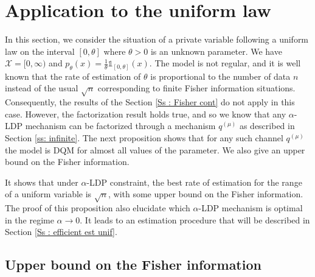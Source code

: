 \documentclass[a4paper, 11pt]{article}
\theoremstyle{definition}
\newcommand{\cX}{{\mathcal{X}}}
\newcommand{\indi}[1]{\mathds{1}_{#1}}
\begin{document}
{%








\section{Application to the uniform law}{\label{s: unif}}

In this section, we consider the situation of a private variable following a uniform law on the interval $[0,\theta]$ where $\theta>0$ is an unknown parameter. We have $\cX=[0,\infty)$ and $p_{\theta}(x)=\frac{1}{\theta} \indi{[0,\theta]}(x)$. The model is not regular, and it is well known that the rate of estimation of $\theta$ is proportional to the number of data $n$ instead of the usual $\sqrt{n}$ corresponding to finite Fisher information situations.
Consequently, the results of the Section \ref{Ss : Fisher cont} do not apply in this case. However, the factorization result holds true, and so we know that any $\alpha$-LDP mechanism can be factorized through a mechanism $q^{(\mu)}$ as described in Section \ref{ss: infinite}. 
The next proposition shows that for any such channel $q^{(\mu)}$ the model is DQM for almost all values of the parameter. We also give an upper bound on the Fisher information.

It shows that under $\alpha$-LDP constraint, the best rate of estimation for the range of a uniform variable is $\sqrt{n}$, with some upper bound on the Fisher information. The proof of this proposition also elucidate which $\alpha$-LDP mechanism is optimal in the regime $\alpha \to 0$. It leads to an estimation procedure that will be described in Section \ref{Ss : efficient est unif}.

\subsection{Upper bound on the Fisher information}

}
\end{document}
